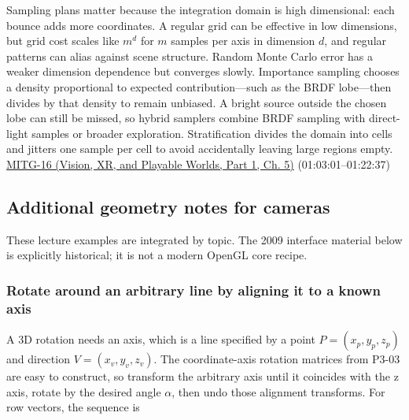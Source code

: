 Sampling plans matter because the integration domain is high dimensional: each bounce adds more coordinates. A regular grid can be effective in low dimensions, but grid cost scales like \(m^d\) for \(m\) samples per axis in dimension \(d\), and regular patterns can alias against scene structure. Random Monte Carlo error has a weaker dimension dependence but converges slowly. Importance sampling chooses a density proportional to expected contribution---such as the BRDF lobe---then divides by that density to remain unbiased. A bright source outside the chosen lobe can still be missed, so hybrid samplers combine BRDF sampling with direct-light samples or broader exploration. Stratification divides the domain into cells and jitters one sample per cell to avoid accidentally leaving large regions empty. \href{../07-Vision-XR-and-Playable-Worlds-P01/main.pdf\#04-visual-computing-ii-ch036-mitg-16---global-illumination}{MITG-16 (Vision, XR, and Playable Worlds, Part 1, Ch. 5)} (01:03:01--01:22:37)

\subsection{Additional geometry notes for cameras}\label{03-visual-computing-i-ch011-additional-geometry-notes-for-cameras}

\hypertarget{03-visual-computing-i-ch011-additional-geometry-notes-for-cameras}{}

These lecture examples are integrated by topic. The 2009 interface material below is explicitly historical; it is not a modern OpenGL core recipe.

\subsubsection{Rotate around an arbitrary line by aligning it to a known axis}\label{03-visual-computing-i-ch011-rotate-around-an-arbitrary-line-by-aligning-it-to-a-known-axis}

\hypertarget{03-visual-computing-i-ch011-rotate-around-an-arbitrary-line-by-aligning-it-to-a-known-axis}{}

A 3D rotation needs an axis, which is a line specified by a point \(P=(x_p,y_p,z_p)\) and direction \(V=(x_v,y_v,z_v)\). The coordinate-axis rotation matrices from P3-03 are easy to construct, so transform the arbitrary axis until it coincides with the z axis, rotate by the desired angle \(\alpha\), then undo those alignment transforms. For row vectors, the sequence is

